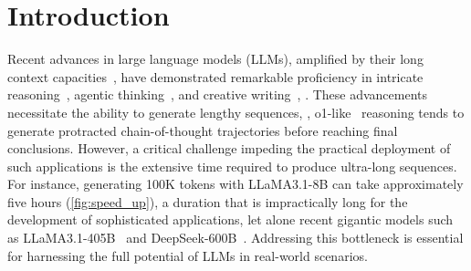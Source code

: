 

\section{Introduction}
Recent advances in large language models (LLMs), amplified by their long context capacities~\citep{cream,longrope}, have demonstrated remarkable proficiency in intricate reasoning~\citep{o1,deepseek_r1}, agentic thinking~\citep{reflexion,react,ram}, and creative writing~\cite{long_stroy1,long_stroy2}, \etc. These advancements necessitate the ability to generate lengthy sequences,
\eg, o1-like~\citep{o1} reasoning tends to generate protracted chain-of-thought trajectories before reaching final conclusions.
However, a critical challenge impeding the practical deployment of such applications is the extensive time required to produce ultra-long sequences. For instance, generating 100K tokens with LLaMA3.1-8B can take approximately five hours (\cref{fig:speed_up}), a duration that is impractically long for the development of sophisticated applications, let alone recent gigantic models such as LLaMA3.1-405B~\citep{llama3} and DeepSeek-600B~\cite{deepseek_v3}. Addressing this bottleneck is essential for harnessing the full potential of LLMs in real-world scenarios. 

